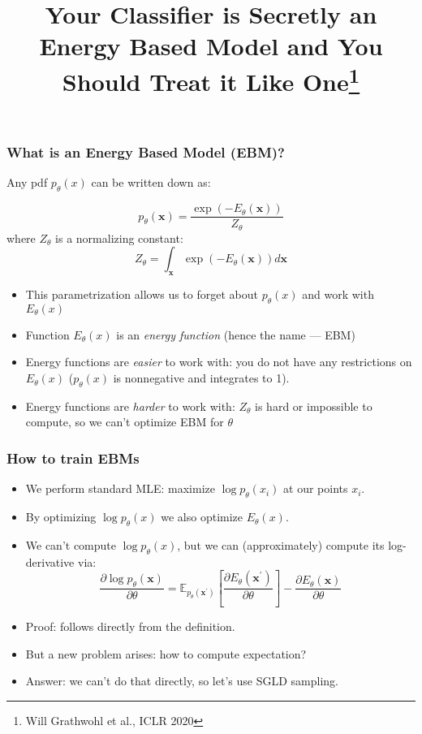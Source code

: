 \documentclass[10pt]{beamer}
\title{Your Classifier is Secretly an Energy Based Model and You Should Treat it Like One\footnote{Will Grathwohl et al., ICLR 2020}}
\begin{document}
\begin{frame}
    \titlepage
\end{frame}

\begin{frame}
    \frametitle{What is an Energy Based Model (EBM)?}
\pause
Any pdf $p_\theta(x)$ can be written down as:
    
    \begin{equation}
p_{\theta}(\mathbf{x})=\frac{\exp \left(-E_{\theta}(\mathbf{x})\right)}{Z_\theta}
\end{equation}
\pause
where $Z_\theta$ is a normalizing constant:
\begin{equation*}
Z_\theta = \int_{\bm x} \exp{(-E_\theta(\bm x))}d\bm x
\end{equation*}

\begin{itemize}
    \item\pause This parametrization allows us to forget about $p_\theta(x)$ and work with $E_\theta(x)$
    \item\pause Function $E_\theta(x)$ is an \textit{energy function} (hence the name --- EBM)
    \item\pause Energy functions are \textit{easier} to work with: you do not have any restrictions on $E_\theta(x)$ ($p_\theta(x)$ is nonnegative and integrates to 1).
    \item\pause Energy functions are \textit{harder} to work with: $Z_\theta$ is hard or impossible to compute, so we can't optimize EBM for $\theta$
\end{itemize}
\end{frame}

\begin{frame}
    \frametitle{How to train EBMs}
    
    \begin{itemize}
        \item\pause We perform standard MLE: maximize $\log p_\theta(x_i)$ at our points $x_i$.
        \item\pause By optimizing $\log p_\theta(x)$ we also optimize $E_\theta(x)$.
        \item\pause We can't compute $\log p_\theta(x)$, but we can (approximately) compute its log-derivative via:
\begin{equation}
\frac{\partial \log p_{\theta}(\mathbf{x})}{\partial \theta}=\mathbb{E}_{p_{\theta}\left(\mathbf{x}^{\prime}\right)}\left[\frac{\partial E_{\theta}\left(\mathbf{x}^{\prime}\right)}{\partial \theta}\right]-\frac{\partial E_{\theta}(\mathbf{x})}{\partial \theta}
\end{equation}
        \item\pause Proof: follows directly from the definition.
        \item\pause But a new problem arises: how to compute expectation?
        \item\pause Answer: we can't do that directly, so let's use SGLD sampling.
    \end{itemize}
\end{frame}
\end{document}
